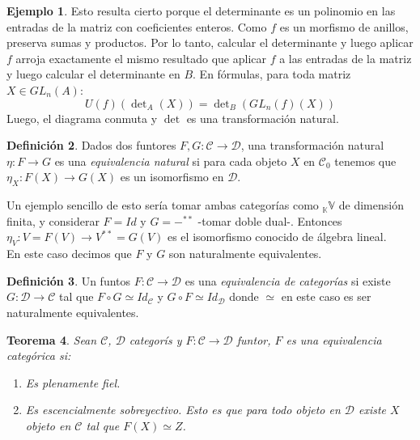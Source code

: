 \documentclass{article}
\newcommand{\cuerpo}{\mathbb{K}}
\theoremstyle{plain}
\newtheorem{theorem}{Teorema}[section]
\theoremstyle{definition}
\newtheorem{definition}[theorem]{Definición}
\newtheorem{ejemplo}[theorem]{Ejemplo}
\theoremstyle{remark}
\begin{document}
\begin{ejemplo}
    Esto resulta cierto porque el determinante es un polinomio en las entradas de la matriz con coeficientes enteros. Como $f$ es un morfismo de anillos, preserva sumas y productos. Por lo tanto, calcular el determinante y luego aplicar $f$ arroja exactamente el mismo resultado que aplicar $f$ a las entradas de la matriz y luego calcular el determinante en $B$. En fórmulas, para toda matriz $X \in GL_n(A)$:
    \begin{equation*}
        U(f)(\det\nolimits_A(X)) = \det\nolimits_B(GL_n(f)(X))
    \end{equation*}
    Luego, el diagrama conmuta y $\det$ es una transformación natural.
\end{ejemplo}

\begin{definition}
    Dados dos funtores $F,G:\mathcal{C} \to \mathcal{D}$, una transformación natural $\eta:F \to G$ es una \textit{equivalencia natural} si para cada objeto $X$ en $\mathcal{C}_0$ tenemos que $\eta_X:F(X) \to G(X)$ es un isomorfismo en $\mathcal{D}$.
\end{definition}

Un ejemplo sencillo de esto sería tomar ambas categorías como ${}_\cuerpo \mathbb{V}$ de dimensión finita, y considerar $F = Id$ y $G = -^{**}$ -tomar doble dual-. Entonces $\eta_V:V = F(V)\to V^{**} = G(V)$ es el isomorfismo conocido de álgebra lineal. \\

En este caso decimos que $F$ y $G$ son naturalmente equivalentes. \\

\begin{definition}
    Un funtos $F:\mathcal{C} \to \mathcal{D}$ es una \textit{equivalencia de categorías} si existe $G:\mathcal{D} \to \mathcal{C}$ tal que $F \circ G \simeq Id_{\mathcal{C}}$ y $G \circ F \simeq Id_{\mathcal{D}}$ donde $\simeq$ en este caso es ser naturalmente equivalentes.
\end{definition}

\begin{theorem}
    Sean $\mathcal{C}$, $\mathcal{D}$ categorís y $F:\mathcal{C} \to \mathcal{D}$ funtor, $F$ es una equivalencia categórica si:

    \begin{enumerate}
        \item Es plenamente fiel.
        \item Es \textit{escencialmente sobreyectivo}. Esto es que para todo objeto en $\mathcal{D}$ existe $X$ objeto en $\mathcal{C}$ tal que $F(X) \simeq Z$.
    \end{enumerate}
\end{theorem}
\end{document}
